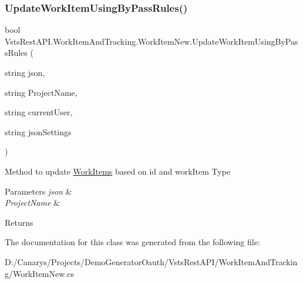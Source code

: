\subsubsection{\texorpdfstring{Update\+Work\+Item\+Using\+By\+Pass\+Rules()}{UpdateWorkItemUsingByPassRules()}}
{\footnotesize\ttfamily bool Vsts\+Rest\+A\+P\+I.\+Work\+Item\+And\+Tracking.\+Work\+Item\+New.\+Update\+Work\+Item\+Using\+By\+Pass\+Rules (\begin{DoxyParamCaption}\item[{string}]{json,  }\item[{string}]{Project\+Name,  }\item[{string}]{current\+User,  }\item[{string}]{json\+Settings }\end{DoxyParamCaption})}



Method to update \mbox{\hyperlink{class_vsts_rest_a_p_i_1_1_work_item_and_tracking_1_1_work_items}{Work\+Items}} based on id and work\+Item Type 


\begin{DoxyParams}{Parameters}
{\em json} & \\
\hline
{\em Project\+Name} & \\
\hline
\end{DoxyParams}
\begin{DoxyReturn}{Returns}

\end{DoxyReturn}


The documentation for this class was generated from the following file\+:\begin{DoxyCompactItemize}
\item 
D\+:/\+Canarys/\+Projects/\+Demo\+Generator\+Oauth/\+Vsts\+Rest\+A\+P\+I/\+Work\+Item\+And\+Tracking/Work\+Item\+New.\+cs\end{DoxyCompactItemize}
